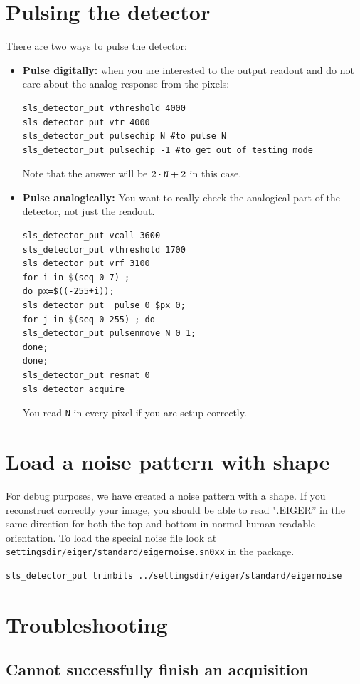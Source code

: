 \documentclass{article}
\begin{document}
\section{Pulsing the detector}
There are two ways to pulse the detector: 
\begin{itemize}
\item \textbf{Pulse digitally:} when you are interested to the output readout and do not care about the analog response from the pixels:
 \begin{verbatim}
sls_detector_put vthreshold 4000
sls_detector_put vtr 4000
sls_detector_put pulsechip N #to pulse N
sls_detector_put pulsechip -1 #to get out of testing mode 
\end{verbatim}
Note that the answer will be $2 \cdot \textrm{{\tt{N}}} +2$ in this case.

\item  \textbf{Pulse analogically:} You want to really check the analogical part of the detector, not just the readout.

 \begin{verbatim}
sls_detector_put vcall 3600
sls_detector_put vthreshold 1700
sls_detector_put vrf 3100
for i in $(seq 0 7) ; 
do px=$((-255+i)); 
sls_detector_put  pulse 0 $px 0;
for j in $(seq 0 255) ; do
sls_detector_put pulsenmove N 0 1;
done;
done;
sls_detector_put resmat 0
sls_detector_acquire
\end{verbatim}
You read {\tt{N}} in every pixel if you are setup correctly. 
\end{itemize}
 
\section{Load a noise pattern with shape}
For debug purposes, we have created a noise pattern with a shape. If you reconstruct correctly your image, you should be able to read ".EIGER'' in the same direction for both the top and bottom in normal human readable orientation.
To load the special noise file look at {\tt{settingsdir/eiger/standard/eigernoise.sn0xx}} in the package. 
\begin{verbatim}
sls_detector_put trimbits ../settingsdir/eiger/standard/eigernoise
\end{verbatim}

\section{Troubleshooting}
\subsection{Cannot successfully finish an acquisition}
\end{document}
